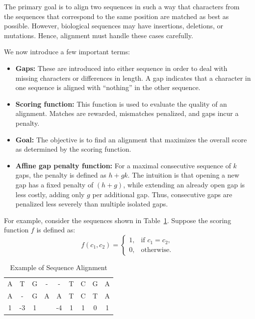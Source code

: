 \documentclass[12pt]{book}
\begin{document}
The primary goal is to align two sequences in such a way that characters from the sequences that correspond to the same position are matched as best as possible. However, biological sequences may have insertions, deletions, or mutations. Hence, alignment must handle these cases carefully.

We now introduce a few important terms:
\begin{itemize}
    \item \textbf{Gaps:} These are introduced into either sequence in order to deal with missing characters or differences in length. A gap indicates that a character in one sequence is aligned with ``nothing'' in the other sequence.
    \item \textbf{Scoring function:} This function is used to evaluate the quality of an alignment. Matches are rewarded, mismatches penalized, and gaps incur a penalty.
    \item \textbf{Goal:} The objective is to find an alignment that maximizes the overall score as determined by the scoring function.
    \item \textbf{Affine gap penalty function:} For a maximal consecutive sequence of $k$ gaps, the penalty is defined as $h+gk$. The intuition is that opening a new gap has a fixed penalty of $(h+g)$, while extending an already open gap is less costly, adding only $g$ per additional gap. Thus, consecutive gaps are penalized less severely than multiple isolated gaps.
\end{itemize}

For example, consider the sequences shown in Table~\ref{tab:exampseq}. Suppose the scoring function $f$ is defined as:
\[
f(c_1,c_2) =
\begin{cases}
    1, & \text{if } c_1 = c_2, \\
    0, & \text{otherwise}.
\end{cases}
\]

\begin{table}[ht]
    \centering
    \begin{tabular}{c|c|c|cc|cccc}
        A & T & G & - & - & T & C & G & A\\
        A & - & G & A & A & T & C & T & A\\
        \hline
        1 & -3 & 1 &  & -4 & 1 & 1 & 0 & 1\\
    \end{tabular}
    \caption{Example of Sequence Alignment}
    \label{tab:exampseq}
\end{table}
\end{document}
